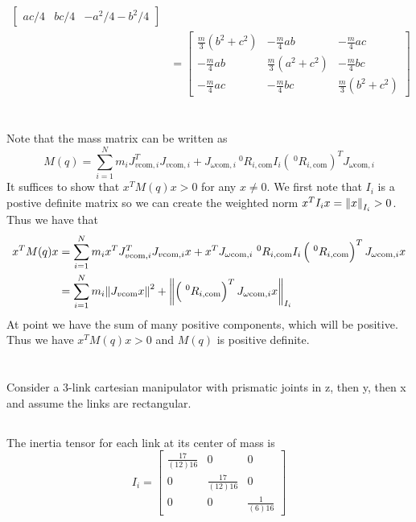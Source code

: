 \documentclass{../homework}
\begin{document}
\begin{parts}[n]
\begin{parts}
\[\begin{aligned}
\begin{bmatrix}
                       ac/4 & bc/4 & -a^2/4 - b^2/4
                   \end{bmatrix}
                   \\
                       &=
                       \begin{bmatrix}
                           \frac{m}{3}(b^2 + c^2) & -\frac{m}{4}ab & -\frac{m}{4}ac \\
                           -\frac{m}{4}ab & \frac{m}{3}(a^2 + c^2) & -\frac{m}{4}bc \\
                           -\frac{m}{4}ac & -\frac{m}{4}bc & \frac{m}{3}(b^2 + c^2)
                       \end{bmatrix}
               \end{aligned}
           \]
           \part{}
           Note that the mass matrix can be written as
           \[
               M(q) = \sum_{i=1}^{N} m_iJ_{v\text{com},i}^TJ_{v\text{com},i} + J_{\omega\text{com},i}\ ^0R_{i,\text{com}} I_i \left( \ ^0R_{i,\text{com}} \right)^T J_{\omega\text{com},i}
           \]
           It suffices to show that $x^TM(q)x > 0$ for any $x \neq 0$. We first note that $I_i$ is a postive definite matrix so we can create the weighted norm $x^TI_ix = \norm{x}_{I_i} > 0$. Thus we have that
           \[
               \begin{aligned}
                   x^TM(q)x &= \sum_{i=1}^{N} m_ix^TJ_{v\text{com},i}^TJ_{v\text{com},i}x + x^TJ_{\omega\text{com},i}\ ^0R_{i,\text{com}} I_i \left( \ ^0R_{i,\text{com}} \right)^T J_{\omega\text{com},i}x \\
                            &= \sum_{i=1}^{N} m_i\norm{J_{v\text{com}}x}^2 + \norm{ \left(\ ^0R_{i,\text{com}}\right)^TJ_{\omega\text{com},i}x }_{I_i}
               \end{aligned}
           \]
           At point we have the sum of many positive components, which will be positive. Thus we have $x^TM(q)x > 0$ and $M(q)$ is positive definite.
           \part{}
           Consider a 3-link cartesian manipulator with prismatic joints in z, then y, then x and assume the links are rectangular.
           \begin{parts}[r]
               \part{} The inertia tensor for each link at its center of mass is
               \[
                   I_i = \begin{bmatrix}
                       \frac{17}{(12)16} & 0 & 0 \\
                       0 & \frac{17}{(12)16} & 0 \\
                       0 & 0 & \frac{1}{(6)16}
                   \end{bmatrix}
               \]

\end{parts}
\end{parts}
\end{parts}
\end{document}
